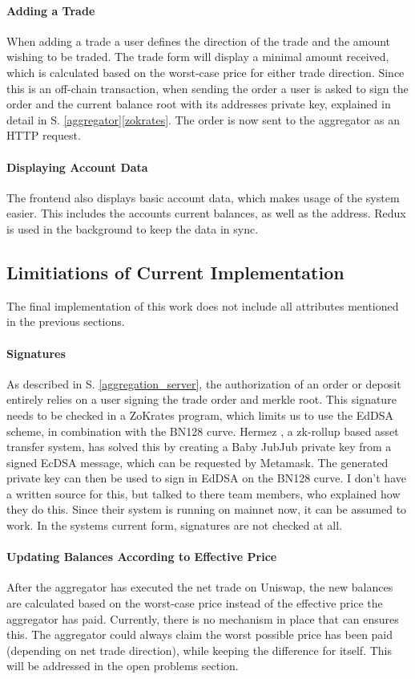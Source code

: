 \documentclass[../../thesis.tex]{subfiles}
\begin{document}
\paragraph{Adding a Trade}
When adding a trade a user defines the direction of the trade and the amount wishing to be traded. The trade form will display a minimal amount received, which is calculated based on the worst-case price for either trade direction. Since this is an off-chain transaction, when sending the order a user is asked to sign the order and the current balance root with its addresses private key, explained in detail in S. \ref{aggregator}\ref{zokrates}. The order is now sent to the aggregator as an HTTP request. 

\paragraph{Displaying Account Data}
The frontend also displays basic account data, which makes usage of the system easier. This includes the accounts current balances, as well as the address. Redux is used in the background to keep the data in sync.

\subsection{Limitiations of Current Implementation}
The final implementation of this work does not include all attributes mentioned in the previous sections. 

\paragraph{Signatures}
As described in S. \ref{aggregation_server}, the authorization of an order or deposit entirely relies on a user signing the trade order and merkle root. This signature needs to be checked in a ZoKrates program, which limits us to use the EdDSA scheme, in combination with the BN128 curve. Hermez \cite{hermez_docs}, a zk-rollup based asset transfer system, has solved this by creating a Baby JubJub\cite{baylinaeddsa} private key from a signed EcDSA message, which can be requested by Metamask. The generated private key can then be used to sign in EdDSA on the BN128 curve. I don't have a written source for this, but talked to there team members, who explained how they do this. Since their system is running on mainnet now, it can be assumed to work. In the systems current form, signatures are not checked at all.

\paragraph{Updating Balances According to Effective Price}
After the aggregator has executed the net trade on Uniswap, the new balances are calculated based on the worst-case price instead of the effective price the aggregator has paid. Currently, there is no mechanism in place that can ensures this. The aggregator could always claim the worst possible price has been paid (depending on net trade direction), while keeping the difference for itself. This will be addressed in the open problems section.
\end{document}
